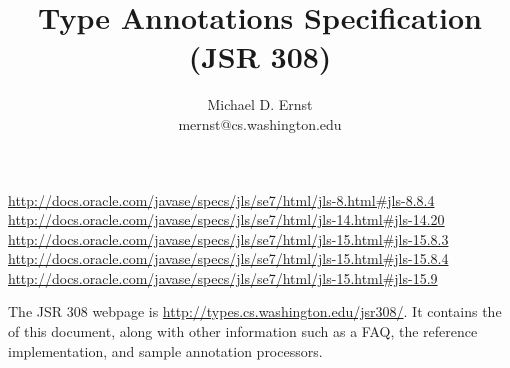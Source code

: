 \documentclass[10pt]{article}
\title{Type Annotations Specification (JSR 308)}
\author{Michael D. Ernst \\
{\ttfamily mernst@cs.washington.edu}
}
\begin{document}
\def\codesize{\smaller}
\newcommand{\code}[1]{{\ifmmode{\mbox{\codesize\ttfamily{#1}}}\else{\codesize\ttfamily #1}\fi}}
\def\<#1>{\code{#1}}
\newcommand{\codesmall}[1]{\ifmmode{\mbox{\small\ttfamily{#1}}}\else{\small\ttfamily #1}\fi}
\newcommand{\codefootnotesize}[1]{\ifmmode{\mbox{\footnotesize\ttfamily{#1}}}\else{\footnotesize\ttfamily #1}\fi}
\newcommand{\myurl}[1]{{\codesize\url{#1}}}





\makeatletter
\def\topfigrule{\kern3\p@ \hrule \kern -3.4\p@} %
\def\botfigrule{\kern-3\p@ \hrule \kern 2.6\p@} %
\def\dblfigrule{\kern3\p@ \hrule \kern -3.4\p@} %
\makeatother


\urldef{\jlsEightEightFour}\url{http://docs.oracle.com/javase/specs/jls/se7/html/jls-8.html#jls-8.8.4}
\urldef{\jlsFourteenTwenty}\url{http://docs.oracle.com/javase/specs/jls/se7/html/jls-14.html#jls-14.20}
\urldef{\jlsFifteenEightThree}\url{http://docs.oracle.com/javase/specs/jls/se7/html/jls-15.html#jls-15.8.3}
\urldef{\jlsFifteenEightFour}\url{http://docs.oracle.com/javase/specs/jls/se7/html/jls-15.html#jls-15.8.4}
\urldef{\jlsFifteenNine}\url{http://docs.oracle.com/javase/specs/jls/se7/html/jls-15.html#jls-15.9}



\maketitle

The JSR 308 webpage is \myurl{http://types.cs.washington.edu/jsr308/}.
It contains the
of this document, along
with other information such as a FAQ, the reference implementation, and
sample annotation processors.
\end{document}
